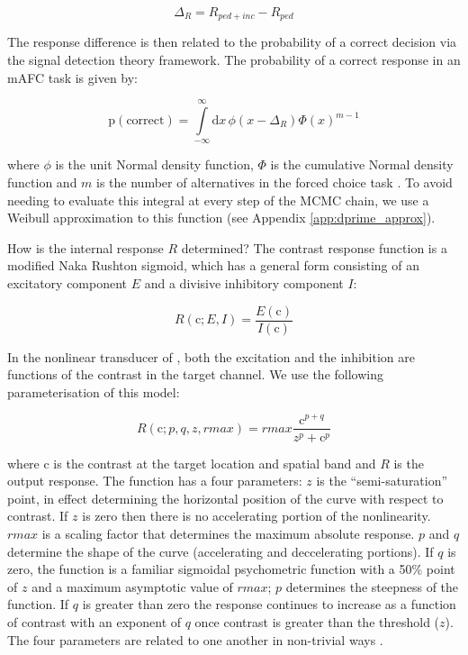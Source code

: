 \documentclass[11pt,a4paper]{article}
\begin{document}
\begin{equation}
\label{eq:delta_r}
\Delta_R = R_{ped + inc} - R_{ped}
\end{equation}

The response difference is then related to the probability of a correct decision via the signal detection theory framework.
The probability of a correct response in an mAFC task is given by:

\begin{equation}
\label{eq:sdt_mafc}
\mathrm{p(correct)} = \int\limits_{-\infty} ^{\infty} \mathrm{d}x \, \phi(x - \Delta_R)\Phi(x)^{m-1} 
\end{equation}

where $\phi$ is the unit Normal density function, $\Phi$ is the cumulative Normal density function and $m$ is the number of alternatives in the forced choice task \citep{Hacker1979}.
To avoid needing to evaluate this integral at every step of the MCMC chain, we use a Weibull approximation to this function (see Appendix \ref{app:dprime_approx}).

How is the internal response $R$ determined?
The contrast response function is a modified Naka Rushton sigmoid, which has a general form consisting of an excitatory component $E$ and a divisive inhibitory component $I$:

\begin{equation}
R(\mathrm{c}; E, I) = \frac{ E(\mathrm{c})} {I(\mathrm{c})}
\end{equation}

In the nonlinear transducer of \citet{Legge1980}, both the excitation and the inhibition are functions of the contrast in the target channel.
We use the following parameterisation of this model:

\begin{equation}
\label{eq:nonlinear_transducer}
R(\mathrm{c}; p, q, z, rmax) = rmax \frac{ \mathrm{c}^{p + q}} {z^p + \mathrm{c}^p}
\end{equation}

where $\mathrm{c}$ is the contrast at the target location and spatial band and $R$ is the output response.
The function has a four parameters: $z$ is the ``semi-saturation'' point, in effect determining the horizontal position of the curve with respect to contrast.
If $z$ is zero then there is no accelerating portion of the nonlinearity.
$rmax$ is a scaling factor that determines the maximum absolute response.
$p$ and $q$ determine the shape of the curve (accelerating and deccelerating portions).
If $q$ is zero, the function is a familiar sigmoidal psychometric function with a 50\% point of $z$ and a maximum asymptotic value of $rmax$; $p$ determines the steepness of the function.
If $q$ is greater than zero the response continues to increase as a function of contrast with an exponent of $q$ once contrast is greater than the threshold ($z$).
The four parameters are related to one another in non-trivial ways \citep[shown analytically by][]{Yu2003,Haun2009}.
\end{document}
